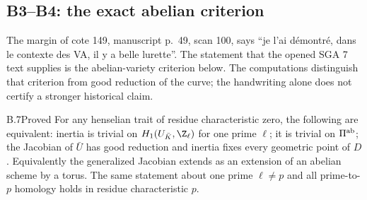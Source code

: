 \subsection{B3--B4: the exact abelian criterion}

The margin of cote 149, manuscript p.~49, scan 100, says ``je l'ai
d\'emontr\'e, dans le contexte des VA, il y a belle lurette''. The statement
that the opened SGA 7 text supplies is the abelian-variety criterion below.
The computations distinguish that criterion from good reduction of the
curve; the handwriting alone does not certify a stronger historical claim.

\begin{claim}{B.7}{Proved}
For any henselian trait of residue characteristic zero, the following are
equivalent: inertia is trivial on $H_1(U_{\bar K},\Z_\ell)$ for one prime
$\ell$; it is trivial on $\Pi^{\rm ab}$; the Jacobian of $\bar U$ has good
reduction and inertia fixes every geometric point of $D$. Equivalently the
generalized Jacobian extends as an extension of an abelian scheme by a
torus. The same statement about one prime $\ell\ne p$ and all prime-to-$p$
homology holds in residue characteristic $p$.
\end{claim}
